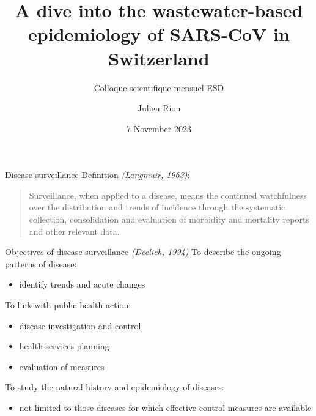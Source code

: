 \documentclass[
  ignorenonframetext,
]{beamer}
\title{A dive into the wastewater-based epidemiology of SARS-CoV in
Switzerland}
\subtitle{Colloque scientifique mensuel ESD}
\author{Julien Riou}
\date{7 November 2023}
\providecommand{\tightlist}{%
  \setlength{\itemsep}{0pt}\setlength{\parskip}{0pt}}
\begin{document}
\frame{\titlepage}

\begin{frame}{Disease surveillance}
\protect\hypertarget{disease-surveillance}{}
Definition \emph{(Langmuir, 1963)}:

\bigskip

\begin{quote}
Surveillance, when applied to a disease, means the \alert{continued watchfulness} over the distribution and trends of incidence through the systematic \alert{collection}, \alert{consolidation} and \alert{evaluation} of morbidity and mortality reports and other relevant data.
\end{quote}
\end{frame}

\begin{frame}{Objectives of disease surveillance \emph{(Declich, 1994)}}
\protect\hypertarget{objectives-of-disease-surveillance-declich-1994}{}
To describe the \alert{ongoing patterns} of disease:

\begin{itemize}
\tightlist
\item
  identify trends and acute changes \pause\medskip
\end{itemize}

To link with \alert{public health action}:

\begin{itemize}
\item
  disease investigation and control
\item
  health services planning
\item
  evaluation of measures \pause\medskip
\end{itemize}

To study the \alert{natural history} and \alert{epidemiology} of
diseases:

\begin{itemize}
\tightlist
\item
  not limited to those diseases for which effective control measures are
  available
\end{itemize}
\end{frame}
\end{document}

